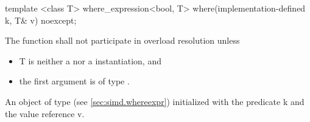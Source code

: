 \begin{itemdecl}
template <class T> where_expression<bool, T> where(implementation-defined k, T& v) noexcept;
\end{itemdecl}
\begin{itemdescr}
  \pnum\remarks The function shall not participate in overload resolution unless
  \begin{itemize}
    \item \type T is neither a \simd nor a \mask instantiation, and
    \item the first argument is of type \bool.
  \end{itemize}
  \pnum\returns An object of type  (see \ref{sec:simd.whereexpr}) initialized with the predicate \code k and the value reference \code v.
\end{itemdescr}

